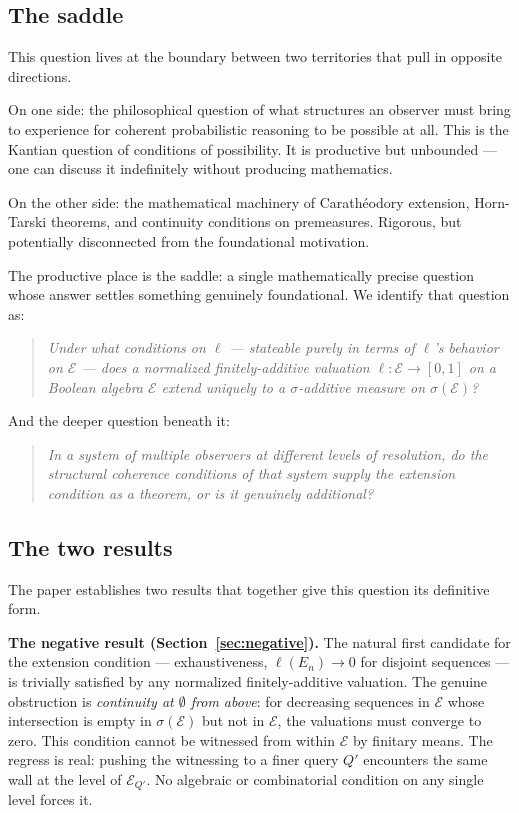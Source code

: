 \documentclass[12pt]{article}
\theoremstyle{definition}
\theoremstyle{remark}
\newcommand{\E}{\mathcal{E}}
\newcommand{\sigE}{\sigma(\mathcal{E})}
\begin{document}
\subsection{The saddle}

This question lives at the boundary between two territories that pull in opposite
directions.

On one side: the philosophical question of what structures an observer must bring to
experience for coherent probabilistic reasoning to be possible at all.  This is the
Kantian question of conditions of possibility.  It is productive but unbounded ---
one can discuss it indefinitely without producing mathematics.

On the other side: the mathematical machinery of Carath\'{e}odory extension,
Horn-Tarski theorems, and continuity conditions on premeasures.  Rigorous, but
potentially disconnected from the foundational motivation.

The productive place is the saddle: a single mathematically precise question whose
answer settles something genuinely foundational.  We identify that question as:

\begin{quote}
\emph{Under what conditions on $\ell$ --- stateable purely in terms of $\ell$'s
behavior on $\E$ --- does a normalized finitely-additive valuation $\ell : \E \to
[0,1]$ on a Boolean algebra $\E$ extend uniquely to a $\sigma$-additive measure
on $\sigE$?}
\end{quote}

\noindent And the deeper question beneath it:

\begin{quote}
\emph{In a system of multiple observers at different levels of resolution, do the
structural coherence conditions of that system supply the extension condition as a
theorem, or is it genuinely additional?}
\end{quote}

\subsection{The two results}

The paper establishes two results that together give this question its definitive form.

\medskip
\noindent\textbf{The negative result (Section~\ref{sec:negative}).}
The natural first candidate for the extension condition --- exhaustiveness,
$\ell(E_n) \to 0$ for disjoint sequences --- is trivially satisfied by any normalized
finitely-additive valuation.  The genuine obstruction is \emph{continuity at
$\emptyset$ from above}: for decreasing sequences in $\E$ whose intersection is empty
in $\sigE$ but not in $\E$, the valuations must converge to zero.  This condition
cannot be witnessed from within $\E$ by finitary means.  The regress is real: pushing
the witnessing to a finer query $Q'$ encounters the same wall at the level of $\E_{Q'}$.
No algebraic or combinatorial condition on any single level forces it.
\end{document}

